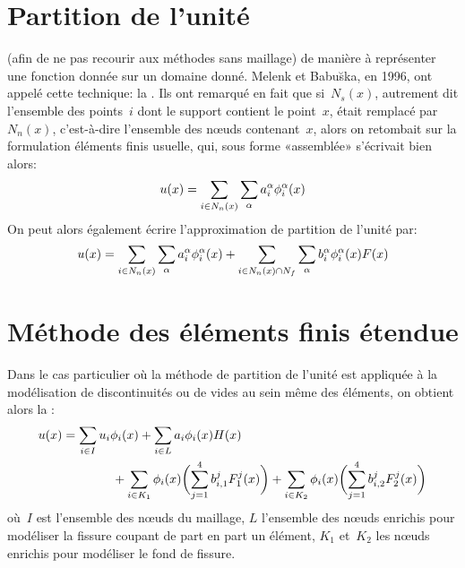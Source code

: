 \section{Partition de l'unité}\label{Sec-partition}
 (afin de ne pas recourir aux méthodes sans maillage) de manière à représenter une fonction donnée sur un domaine donné.
Melenk et
Babu\u{s}ka,
en 1996, ont appelé cette technique:
la .
Ils ont remarqué en fait que si~$N_s(x)$, autrement dit l'ensemble des points~$i$ dont le support contient le point~$x$, était remplacé par~$N_n(x)$, c'est-à-dire l'ensemble des nœuds contenant~$x$, alors on retombait sur la formulation éléments finis usuelle, qui, sous forme «assemblée» s'écrivait bien alors:
\begin{equation}
u(x) = \displaystyle\sum_{i\in N_n(x)}\displaystyle\sum_{\alpha} a_i^\alpha \phi_i^\alpha(x)
\end{equation}
 On peut alors également écrire l'approximation de partition de l'unité par:
\begin{equation}
u(x) = \displaystyle\sum_{i\in N_n(x)}\displaystyle\sum_{\alpha} a_i^\alpha \phi_i^\alpha(x) + \displaystyle\sum_{i\in N_n(x)\cap N_f}\displaystyle\sum_{\alpha} b_i^\alpha\phi_i^\alpha(x)F(x)
\end{equation}



\medskip
\section{Méthode des éléments finis étendue}\label{Sec-XFEM}
Dans le cas particulier où la méthode de partition de l'unité est appliquée à la modélisation de discontinuités ou de vides au sein même des éléments, on obtient alors la :
\begin{equation}
\begin{aligned}
u(x) &= \displaystyle\sum_{i\in I}u_i\phi_i(x) + \displaystyle\sum_{i\in L} a_i\phi_i(x) H(x)\\
&\qquad\qquad + \displaystyle\sum_{i\in K_1}\phi_i(x)\biggl(\displaystyle\sum_{j=1}^4b_{i,1}^jF_1^j(x)\biggr) + \displaystyle\sum_{i\in K_2}\phi_i(x)\biggl(\displaystyle\sum_{j=1}^4b_{i,2}^jF_2^j(x)\biggr)
\end{aligned}
\end{equation}
où~$I$ est l'ensemble des nœuds du maillage, $L$ l'ensemble des nœuds enrichis pour modéliser la fissure coupant de part en part un élément, $K_1$ et~$K_2$ les nœuds enrichis pour modéliser le fond de fissure.


